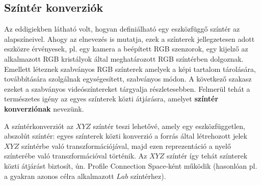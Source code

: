 \subsection{Színtér konverziók}
Az eddigiekben látható volt, hogyan definiálható egy eszközfüggő színtér az alapszíneivel.
Ahogy az elnevezés is mutatja, ezek a színterek jellegzetesen adott eszközre érvényesek, pl. egy kamera a beépített RGB szenzorok, egy kijelző az alkalmazott RGB kristályok által meghatározott RGB színtérben dolgoznak.
Emellett léteznek szabványos RGB színterek amelyek a képi tartalom tárolására, továbbítására szolgálnak egységesített, szabványos módon.
A következő szakasz ezeket a szabványos videószíntereket tárgyalja részletesebben.
Felmerül tehát a természetes igény az egyes színterek közti átjárásra, amelyet \textbf{színtér konverziónak} nevezünk.

A színtérkonverziót az $XYZ$ színtér teszi lehetővé, amely egy eszközfüggetlen, abszolút színtér:
egyes színterek közti konverzió a forrás által létrehozott jelek $XYZ$ színtérbe való transzformációjával, majd ezen reprezentáció a nyelő színterébe való transzformációval történik.
Az $XYZ$ színtér így tehát színterek közti átjárást biztosít, ún. Profile Connection Space-ként működik (hasonlóan pl. a gyakran azonos célra alkalmazott $Lab$ színtérhez).

